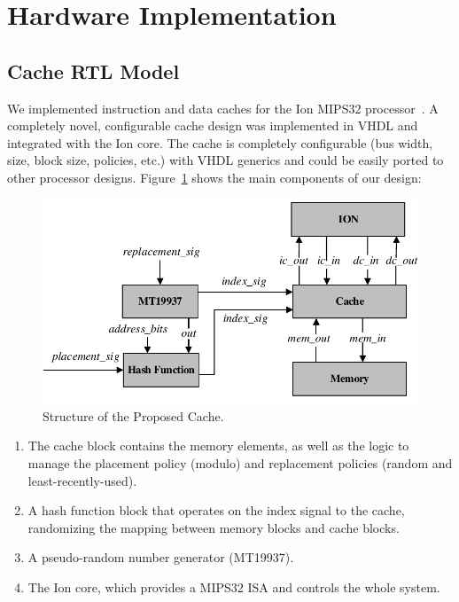 \section{Hardware Implementation}
\label{Hardware Implementation}  
\subsection{Cache RTL Model}
\label{Cache Model}

We implemented instruction and data caches for the Ion
MIPS32 processor~\cite{ION}. A completely novel, configurable cache
design was implemented in VHDL and integrated with the Ion core. The
cache is completely configurable (bus width, size, block size,
policies, etc.) with VHDL generics and could be easily ported to other
processor designs. Figure~\ref{fig:cache-structure} shows the main components of our design:

\begin{figure}[tb!]
   \includegraphics[scale=1]{figures/img/cache_structure_c.pdf}
   \caption{Structure of the Proposed Cache.}
\label{fig:cache-structure}
\end{figure}

\begin{enumerate}
\item The cache block contains the memory elements, as well as the
logic to manage the placement policy (modulo) and replacement policies (random and least-recently-used).
\item A hash function block that operates on the index signal to the
  cache, randomizing the mapping between memory blocks and cache blocks.
\item A pseudo-random number generator (MT19937).
\item The Ion core, which provides a MIPS32 ISA and controls the whole
  system.
\end{enumerate}

